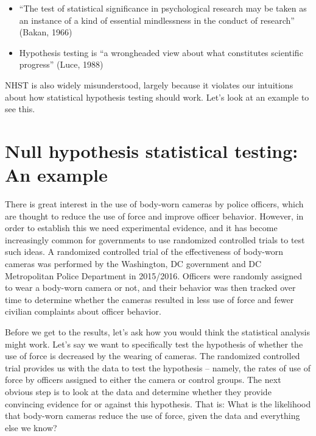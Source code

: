 \documentclass[
  12pt,
]{book}
\providecommand{\tightlist}{%
  \setlength{\itemsep}{0pt}\setlength{\parskip}{0pt}}
\begin{document}
\begin{itemize}
\tightlist
\item
  ``The test of statistical significance in psychological research may be taken as an instance of a kind of essential mindlessness in the conduct of research'' (Bakan, 1966)
\item
  Hypothesis testing is ``a wrongheaded view about what constitutes scientific progress'' (Luce, 1988)
\end{itemize}

NHST is also widely misunderstood, largely because it violates our intuitions about how statistical hypothesis testing should work. Let's look at an example to see this.

\hypertarget{null-hypothesis-statistical-testing-an-example}{%
\section{Null hypothesis statistical testing: An example}\label{null-hypothesis-statistical-testing-an-example}}

There is great interest in the use of body-worn cameras by police officers, which are thought to reduce the use of force and improve officer behavior. However, in order to establish this we need experimental evidence, and it has become increasingly common for governments to use randomized controlled trials to test such ideas. A randomized controlled trial of the effectiveness of body-worn cameras was performed by the Washington, DC government and DC Metropolitan Police Department in 2015/2016. Officers were randomly assigned to wear a body-worn camera or not, and their behavior was then tracked over time to determine whether the cameras resulted in less use of force and fewer civilian complaints about officer behavior.

Before we get to the results, let's ask how you would think the statistical analysis might work. Let's say we want to specifically test the hypothesis of whether the use of force is decreased by the wearing of cameras. The randomized controlled trial provides us with the data to test the hypothesis -- namely, the rates of use of force by officers assigned to either the camera or control groups. The next obvious step is to look at the data and determine whether they provide convincing evidence for or against this hypothesis. That is: What is the likelihood that body-worn cameras reduce the use of force, given the data and everything else we know?
\end{document}
